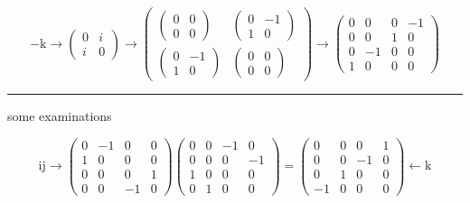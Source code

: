 \documentclass[
]{book}
\theoremstyle{definition}
\theoremstyle{definition}
\theoremstyle{definition}
\theoremstyle{definition}
\theoremstyle{remark}
\begin{document}
\[
-\mathrm{k}\rightarrow\begin{pmatrix}0 & i\\
i & 0
\end{pmatrix}\rightarrow\begin{pmatrix}\begin{pmatrix}0 & 0\\
0 & 0
\end{pmatrix} & \begin{pmatrix}0 & -1\\
1 & 0
\end{pmatrix}\\
\begin{pmatrix}0 & -1\\
1 & 0
\end{pmatrix} & \begin{pmatrix}0 & 0\\
0 & 0
\end{pmatrix}
\end{pmatrix}\rightarrow\begin{pmatrix}0 & 0 & 0 & -1\\
0 & 0 & 1 & 0\\
0 & -1 & 0 & 0\\
1 & 0 & 0 & 0
\end{pmatrix}
\]

\begin{center}\rule{0.5\linewidth}{0.5pt}\end{center}

some examinations

\[
\mathrm{i}\mathrm{j}\rightarrow\begin{pmatrix}0 & -1 & 0 & 0\\
1 & 0 & 0 & 0\\
0 & 0 & 0 & 1\\
0 & 0 & -1 & 0
\end{pmatrix}\begin{pmatrix}0 & 0 & -1 & 0\\
0 & 0 & 0 & -1\\
1 & 0 & 0 & 0\\
0 & 1 & 0 & 0
\end{pmatrix}=\begin{pmatrix}0 & 0 & 0 & 1\\
0 & 0 & -1 & 0\\
0 & 1 & 0 & 0\\
-1 & 0 & 0 & 0
\end{pmatrix}\leftarrow\mathrm{k}
\]
\end{document}

